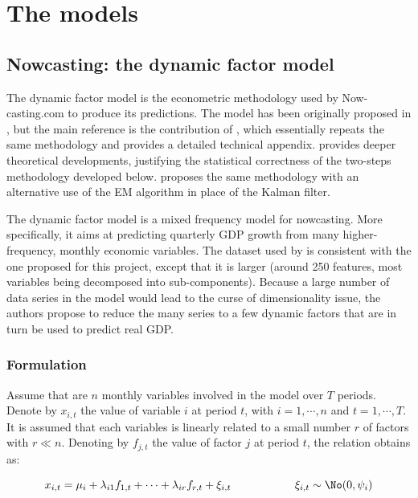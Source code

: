 \chapter{The models}
\label{chapter3}

\section{Nowcasting: the dynamic factor model}
\label{chapter3_section1}

The dynamic factor model is the econometric methodology used by Now-casting.com to produce its predictions. The model has been originally proposed in \cite{Giannone2005}, but the main reference is the contribution of \cite{Giannone2008}, which essentially repeats the same methodology and provides a detailed technical appendix. \cite{Doz2011} provides deeper theoretical developments, justifying the statistical correctness of the two-steps methodology developed below. \cite{Banbura2010} proposes the same methodology with an alternative use of the EM algorithm in place of the Kalman filter.

The dynamic factor model is a mixed frequency model for nowcasting. More specifically, it aims at predicting quarterly GDP growth from many higher-frequency, monthly economic variables. The dataset used by \cite{Giannone2008} is consistent with the one proposed for this project, except that it is larger (around 250 features, most variables being decomposed into sub-components). Because a large number of data series in the model would lead to the curse of dimensionality issue, the authors propose to reduce the many series to a few dynamic factors that are in turn be used to predict real GDP.


\subsection{Formulation}
\label{chapter3_section1_subsection1}

Assume that are $n$ monthly variables involved in the model over $T$ periods. Denote by $x_{i,t}$ the value of variable $i$ at period $t$, with $i = 1, \cdots, n$ and $t = 1, \cdots, T$. It is assumed that each variables is linearly related to a small number $r$ of factors with $r \ll n$. Denoting by $f_{j,t}$ the value of factor $j$ at period $t$, the relation obtains as:

\begin{equation}
x_{i,t} = \mu_i + \lambda_{i1} f_{1,t} + \cdots +  \lambda_{ir} f_{r,t} + \xi_{i,t} \hspace{2cm}
\xi_{i,t} \sim \No(0, \psi_i)
\label{equation_c1_s1_ss1_1}
\end{equation}

